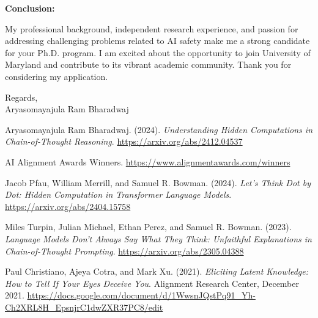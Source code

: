 \documentclass[12pt]{article}
\begin{document}
\textbf{Conclusion:}

My professional background, independent research experience, and passion for addressing challenging problems related to AI safety make me a strong candidate for your Ph.D. program. I am excited about the opportunity to join University of Maryland and contribute to its vibrant academic community. Thank you for considering my application.

Regards,\\
Aryasomayajula Ram Bharadwaj

\newpage
\begin{thebibliography}{9}

Aryasomayajula Ram Bharadwaj. (2024). \emph{Understanding Hidden Computations in Chain-of-Thought Reasoning}.  
\url{https://arxiv.org/abs/2412.04537}

AI Alignment Awards Winners.  
\url{https://www.alignmentawards.com/winners}

Jacob Pfau, William Merrill, and Samuel R. Bowman. (2024). \emph{Let's Think Dot by Dot: Hidden Computation in Transformer Language Models}.  
\url{https://arxiv.org/abs/2404.15758}

Miles Turpin, Julian Michael, Ethan Perez, and Samuel R. Bowman. (2023). \emph{Language Models Don't Always Say What They Think: Unfaithful Explanations in Chain-of-Thought Prompting}.  
\url{https://arxiv.org/abs/2305.04388}

Paul Christiano, Ajeya Cotra, and Mark Xu. (2021). \emph{Eliciting Latent Knowledge: How to Tell If Your Eyes Deceive You}. Alignment Research Center, December 2021.  
\url{https://docs.google.com/document/d/1WwsnJQstPq91_Yh-Ch2XRL8H_EpsnjrC1dwZXR37PC8/edit}

\end{thebibliography}
\end{document}
